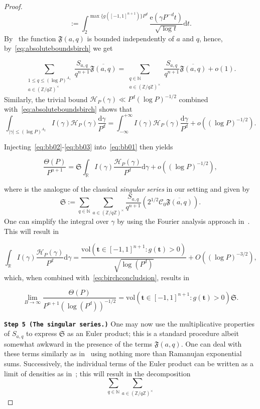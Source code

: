 \documentclass[a4paper,12pt,reqno]{amsart}
\numberwithin{equation}{section} \numberwithin{figure}{section}
\newcommand\Z{\mathbb{Z}}
\newcommand\N{\mathbb{N}}
\newcommand\R{\mathbb{R}}
\renewcommand{\l}{\left}
\renewcommand{\r}{\right}
\renewcommand{\b}{\mathbf}
\renewcommand{\c}{\mathcal}
\renewcommand{\leq}{\leqslant}
\renewcommand{\#}{\sharp}
\theoremstyle{definition}
\numberwithin{lemma}{section}
\newcommand{\beq}[2]
{
\begin{equation}
\label{#1}
{#2}
\end{equation}
}
\begin{document}
\begin{proof}
$$:=  \int_{2}^{\max\{g([-1,1]^{n+1} )\} P^d} \frac{\mathrm e(\gamma P^{-d} t ) }{\sqrt{\log t } }  
\mathrm dt 
 .$$  
By~\cite[Equation (3.11)]{MR4353917} the function $\mathfrak F(a,q)$ is bounded independently of $a$ and $q $,
hence, by~\eqref{eq:absoluteboundsbirch}
we get 
\beq{eq:bb02}{
 \sum_{\substack{ 1\leq  q \leq (\log P)^{ A_1}\\
 a\in (\Z/q\Z)^\times   }} 
\frac{S_{a,q}}{q^{n+1} } 
\overline{ \mathfrak F(a,q)}=
 \sum_{\substack{ q\in \N \\
 a\in (\Z/q\Z)^\times   }} 
\frac{S_{a,q}}{q^{n+1} } 
\overline{ \mathfrak F(a,q)}
+o(1).} Similarly, the trivial bound $\c H_P(\gamma)\ll P^d (\log P)^{-1/2}$
combined with~\eqref{eq:absoluteboundsbirch} shows  that     \beq{eq:bb03}{
\int_{|\gamma|\leq (\log P)^{ A_2}} 
I(\gamma) 
\c H_P(\gamma) 
\frac{\mathrm d \gamma}{P^d}
=\int_{-\infty}^{+\infty}
I(\gamma) 
\c H_P(\gamma) 
\frac{\mathrm d \gamma}{P^d}
+o((\log P)^{-1/2})
.}
Injecting~\eqref{eq:bb02}-\eqref{eq:bb03} into~\eqref{eq:bb01} then yields
\beq{eq:birchconcludsion}{
\frac{ \Theta(P)}{ P^{n+1}}= 
 \mathfrak S
\int_{\R}  I(\gamma)  \frac{\c H_P(\gamma) }{P^d}\mathrm d \gamma
+o\l( (\log P)^{-1/2 }\r),}
where 
 is the analogue of the classical \textit{singular series} in our setting
and given by 
$$ \mathfrak S:=  \sum_{q\in \N} \sum_{ a\in (\Z/q\Z)^\times  } 
\frac{S_{a,q}}{q^{n+1} } \l( 2^{1/2} \c C_0
\overline{ \mathfrak F(a,q)} \r)
.$$ One can simplify the integral over $\gamma$ by using the Fourier analysis approach in~\cite[Lemmas 4.3-4.4]{MR4353917}.
This will result in 
\beq{eq:birchinterpr}{
\int_{\R}  I(\gamma)  \frac{\c H_P(\gamma) }{P^d}\mathrm d \gamma
=\frac{\textrm{vol}(\b t \in [-1,1]^{n+1} :g(\b t )> 0)}{\sqrt{\log(P^d) }}+O((\log P)^{-3/2}) ,} which, when combined with~\eqref{eq:birchconcludsion},
results in
\beq{eq:birchconclreqemion23}{
\lim_{B\to \infty}
\frac{ \Theta(P)}{ P^{n+1}(\log (P^d))^{-1/2}}= 
 \textrm{vol}(\b t \in [-1,1]^{n+1} :g(\b t )> 0)
 \mathfrak S
.}
 \textbf{\texttt{Step 5 (The singular series.)}} One may now use the multiplicative properties of $S_{a,q}$
to express $ \mathfrak S$ as an Euler product; this is a standard procedure albeit somewhat awkward in the presence of the terms
$ \mathfrak F(a,q)$. One can deal with these terms
similarly as in~\cite[Lemmas 5.1]{MR4353917} using nothing more than Ramanujan exponential sums.
Successively, the individual terms of the Euler product can be written as a limit of densities as in~\cite[\S 3.5.2–3.5.3]{fishthesis}; this will result in
the decomposition
$$  \sum_{q\in \N} \sum_{ a\in (\Z/q\Z)^\times  } 
$$
\end{proof}
\end{document}

